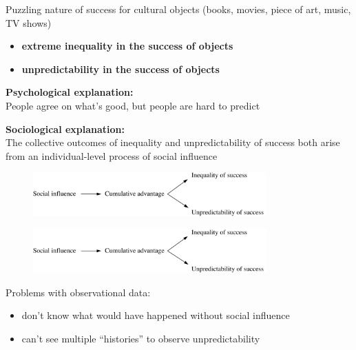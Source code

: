 \documentclass[aspectratio=169]{beamer}
\begin{document}
\begin{frame}

  Puzzling nature of success for cultural objects (books, movies, piece of art, music, TV shows)
  \vspace{0.2in}
  \begin{itemize}
    \item<1-> {\bf extreme inequality in the success of objects} \\
    \item <2->{\bf unpredictability in the success of objects} \\
  \end{itemize}

\end{frame}
\begin{frame} 

\textbf{Psychological explanation:}\\
People agree on what's good, but people are hard to predict\\

\pause
\vspace{0.2in}

\textbf{Sociological explanation:}\\
The collective outcomes of inequality and unpredictability of success both arise from an individual-level process of social influence\\

\begin{figure}
  \includegraphics[width = 0.8\textwidth]{figures/musiclab_model}
\end{figure}

\end{frame}

\begin{frame}

\begin{figure}
  \includegraphics[width = 0.8\textwidth]{figures/musiclab_model}
\end{figure}

Problems with observational data:
\begin{itemize}
\item don't know what would have happened without social influence
\item can't see multiple ``histories'' to observe unpredictability
\end{itemize}

\end{frame}
\end{document}
